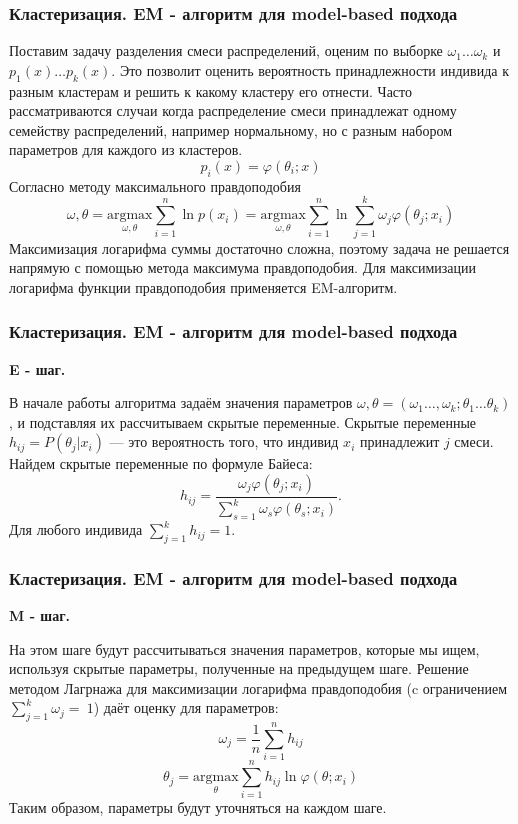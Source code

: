 \documentclass[ucs, notheorems, handout]{beamer}
\begin{document}
	\begin{frame}
	\frametitle{Кластеризация. EM - алгоритм для model-based подхода}
		
		Поставим задачу разделения смеси распределений, оценим по выборке $\omega_{1}\ldots \omega_{k}$ и $p_{1}(x)\ldots p_{k}(x)$. Это позволит оценить вероятность принадлежности индивида к разным кластерам и решить к какому кластеру его отнести. Часто рассматриваются случаи когда распределение смеси принадлежат одному семейству распределений, например нормальному, но с разным набором параметров для каждого из кластеров. 
		$$
		p_{i}(x) = \varphi(\theta_{i}; x)
		$$
		Согласно методу максимального правдоподобия 
		$$
		\omega, \theta = \underset{\omega, \theta}{\text{argmax}} \sum\limits_{i=1}^n \ln{p(x_{i})}  =  \underset{\omega, \theta}{\text{argmax}} \sum\limits_{i=1}^n \ln  \sum\limits_{j=1}^k \omega_{j}  \varphi(\theta_{j}; x_{i})
		$$
		Максимизация логарифма суммы достаточно сложна, поэтому задача не решается напрямую с помощью метода максимума правдоподобия. Для максимизации логарифма функции правдоподобия применяется EM-алгоритм.
	\end{frame}
	
	\begin{frame}
	\frametitle{Кластеризация. EM - алгоритм для model-based подхода}
		
		\textbf{E - шаг.}
		
		В начале работы алгоритма задаём значения параметров $\omega, \theta = (\omega_{1}\ldots, \omega_{k};\theta_{1}\ldots \theta_{k})$, и подставляя их рассчитываем скрытые переменные. Скрытые переменные $h_{ij} = P(\theta_{j}|x_{i})$ --- это вероятность того, что индивид $x_{i}$ принадлежит $j$ смеси. Найдем скрытые переменные по формуле Байеса:
		$$
		h_{ij} = \frac{ \omega_{j} \varphi(\theta_{j}; x_{i})}{\sum\limits_{s=1}^k \omega_{s}  \varphi(\theta_{s}; x_{i})}.
		$$
		Для любого индивида $\sum\limits_{j=1}^k h_{ij} = 1.$
	\end{frame}
	
	\begin{frame}
	\frametitle{Кластеризация. EM - алгоритм для model-based подхода}
		
		\textbf{M - шаг.}

		На этом шаге будут рассчитываться значения параметров, которые мы ищем, используя скрытые параметры, полученные на предыдущем шаге. Решение методом Лагрнажа для максимизации логарифма правдоподобия (c ограничением $\sum\limits_{j=1}^k\omega_{j}=~1$) даёт оценку для параметров:
		$$
		\omega_{j} = \frac{1}{n} \sum\limits_{i=1}^n h_{ij}
		$$
		$$
		\theta_{j} = \underset{\theta}{\text{argmax}} \sum\limits_{i=1}^n h_{ij} \ln{\varphi(\theta; x_{i})}
		$$
		Таким образом, параметры будут уточняться на каждом шаге.
	\end{frame}
	
\end{document}

